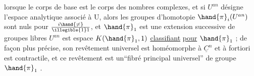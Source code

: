
lorsque le corps de base est le corps des nombres complexes, et si $U^{an}$
désigne l'espace analytique associé à U, alors les groupes  d'homotopie
$\hand{\pi}_i(U^{an})$  sont nuls pour $i\hand{\neq}\over{\illegible{1}}{1}$, et  $\hand{\pi}_1$  est une extension successive
de groupes libres\over{,}{;}   $U^{an}$  est
 espace $K(\hand{\pi}_1 ,1)$\hand{,} \uline{classifiant}  \uline{pour} $\hand{\pi}_1$ ;  de façon plus
précise, son revêtement universel  est  homéomorphe à $\underline{C}^n$  et à fortiori
est contractile, et ce revêtement est un``fibré principal universel'' de
groupe $\hand{\pi}_1$ .

